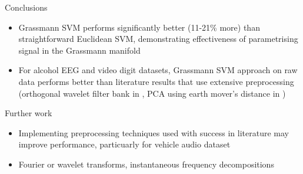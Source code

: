 \documentclass[final]{beamer}
\newlength{\onecolwid}
\begin{document}
\begin{frame}[t]
\begin{columns}[t]
\begin{column}{\onecolwid}

\begin{block}{Conclusions}
    \begin{itemize}
        \item Grassmann SVM performs significantly better (11-21\% more) than straightforward
            Euclidean SVM, demonstrating effectiveness of parametrising signal in the Grassmann
            manifold
        \item For alcohol EEG and video digit datasets, Grassmann SVM approach on raw data performs
            better than literature results that use extensive preprocessing (orthogonal wavelet
            filter bank in \cite{sharma_novel_2017}, PCA using earth mover's distance in
            \cite{lieu_signal_2011})
    \end{itemize}


\end{block}


\begin{block}{Further work}
    \begin{itemize}
        \item Implementing preprocessing techniques used with success in literature may improve
            performance, particuarly for vehicle audio dataset
        \item Fourier or wavelet transforms, instantaneous frequency decompositions
            \cite{chui_signal_2016}
    \end{itemize}
\end{block}


\end{column}
\end{columns}
\end{frame}
\end{document}
